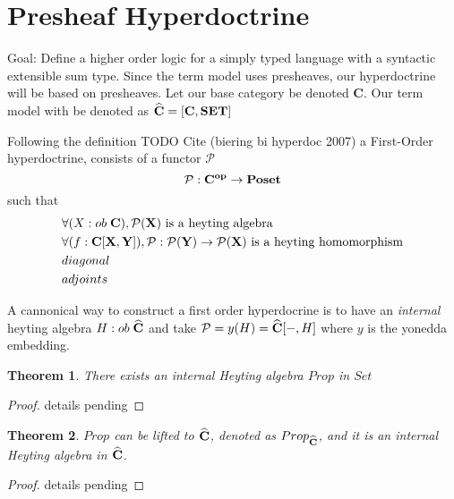 \documentclass{article}
\newtheorem{thm}{Theorem}
\begin{document}

\section{Presheaf Hyperdoctrine}

Goal: Define a higher order logic for a simply typed language with a syntactic extensible sum type.
Since the term model uses presheaves, our hyperdoctrine will be based on presheaves. 
Let our base category be denoted $\mathbf{C}$. 
Our term model with be denoted as $\widehat{\mathbf{C}} = [\bf{C} , \bf{SET}]$

Following the definition TODO Cite (biering bi hyperdoc 2007) a First-Order hyperdoctrine,
consists of a functor $\mathcal{P}$
\[
 \mathcal{P} : \bf{C}^{op} \rightarrow \bf{Poset}   
\]
such that
\begin{align*}
    & \forall (X : ob \;\bf{C}), \mathcal{P}(X) \textrm{ is a heyting algebra}\\
    & \forall (f : \bf{C}[X , Y]), \mathcal{P} : \mathcal{P}(Y) \rightarrow \mathcal{P}(X) \textrm{ is a heyting homomorphism}\\
    & diagonal \\
    & adjoints
\end{align*}

A cannonical way to construct a first order hyperdocrine is to have an \textit{internal} heyting algebra $H : ob \; \widehat{\bf{C}}$
and take $\mathcal{P}= y(H) = \widehat{\bf{C}}[- , H]$ where $y$ is the yonedda embedding.
\begin{thm}
    There exists an internal Heyting algebra $Prop$ in $Set$
\end{thm}
\begin{proof}
    details pending
\end{proof}

\begin{thm}
    $Prop$ can be \textit{lifted} to $\widehat{\bf{C}}$, 
    denoted as $Prop_{\widehat{\bf{C}}}$, and it is an internal Heyting algebra in $\widehat{\bf{C}}$.
\end{thm}
\begin{proof}
    details pending
\end{proof}
\end{document}
